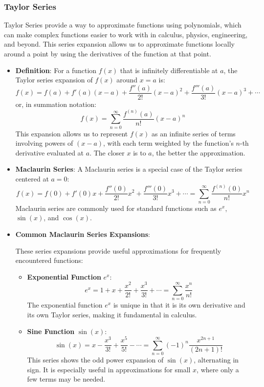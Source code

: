 \subsubsection*{Taylor Series} 

Taylor Series provide a way to approximate functions using polynomials, which can make complex functions easier to work with in calculus, physics, engineering, and beyond. This series expansion allows us to approximate functions locally around a point by using the derivatives of the function at that point. 

\begin{itemize}
\item \textbf{Definition}:
For a function \( f(x) \) that is infinitely differentiable at \( a \), the Taylor series expansion of \( f(x) \) around \( x = a \) is:
\[
f(x) = f(a) + f'(a)(x-a) + \frac{f''(a)}{2!}(x-a)^2 + \frac{f'''(a)}{3!}(x-a)^3 + \cdots
\]
or, in summation notation:
\[
f(x) = \sum_{n=0}^{\infty} \frac{f^{(n)}(a)}{n!} (x-a)^n
\]
This expansion allows us to represent \( f(x) \) as an infinite series of terms involving powers of \( (x - a) \), with each term weighted by the function's \( n \)-th derivative evaluated at \( a \). The closer \( x \) is to \( a \), the better the approximation.

\item \textbf{Maclaurin Series}: 
A Maclaurin series is a special case of the Taylor series centered at \( a = 0 \):
\[
f(x) = f(0) + f'(0)x + \frac{f''(0)}{2!}x^2 + \frac{f'''(0)}{3!}x^3 + \cdots = \sum_{n=0}^{\infty} \frac{f^{(n)}(0)}{n!} x^n
\]
Maclaurin series are commonly used for standard functions such as \( e^x \), \( \sin(x) \), and \( \cos(x) \).

\item \textbf{Common Maclaurin Series Expansions}:

These series expansions provide useful approximations for frequently encountered functions:

    \begin{itemize}
    \item \textbf{Exponential Function} \( e^x \):
        \[
        e^x = 1 + x + \frac{x^2}{2!} + \frac{x^3}{3!} + \cdots = \sum_{n=0}^{\infty} \frac{x^n}{n!}
        \]
        The exponential function \( e^x \) is unique in that it is its own derivative and its own Taylor series, making it fundamental in calculus.

    \item \textbf{Sine Function} \( \sin(x) \):
        \[
        \sin(x) = x - \frac{x^3}{3!} + \frac{x^5}{5!} - \cdots = \sum_{n=0}^{\infty} (-1)^n \frac{x^{2n+1}}{(2n+1)!}
        \]
        This series shows the odd power expansion of \( \sin(x) \), alternating in sign. It is especially useful in approximations for small \( x \), where only a few terms may be needed.


\end{itemize}
\end{itemize}
